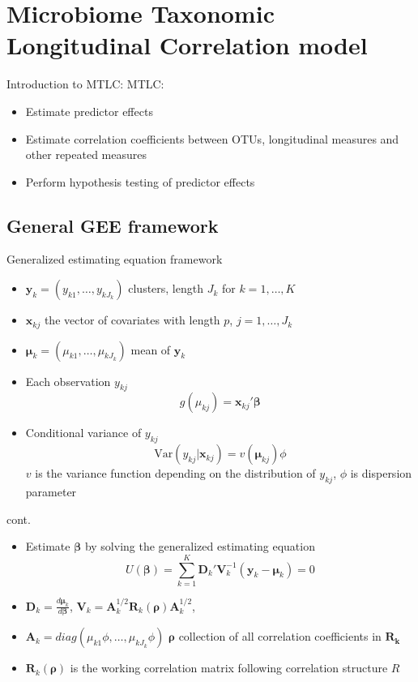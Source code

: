 \documentclass{beamer}
\begin{document}
\section{Microbiome Taxonomic Longitudinal Correlation model}


\begin{frame}[t]{Introduction to MTLC:}
  MTLC:
  \begin{itemize}
    \item Estimate predictor effects
    \item Estimate correlation coefficients between OTUs, longitudinal measures and other repeated measures
    \item Perform hypothesis testing of predictor effects
  \end{itemize}
\end{frame}

\subsection{General GEE framework}

\begin{frame}[t]{Generalized estimating equation framework}
  \begin{itemize}
    \item $\boldsymbol y_k = (y_{k1}, \ldots , y_{kJ_k})$ clusters, length $J_k$ for $k = 1, \ldots , K$
    \item $\mathbf{x}_{kj}$ the vector of covariates with length $p$, $j = 1, \ldots , J_k$
    \item $\boldsymbol\mu_k = (\mu_{k1}, \ldots , \mu_{kJ_k})$ mean of $\boldsymbol y_k$
    \item Each observation $y_{kj}$
    $$g(\mu_{kj}) = \mathbf{x}_{kj}'\boldsymbol\beta$$
    \item Conditional variance of $y_{kj}$
    $$\text{Var}(y_{kj}|\boldsymbol{x}_{kj}) = v(\boldsymbol \mu_{kj})\phi$$
    $v$ is the variance function depending on the distribution of $y_{kj}$, $\phi$ is dispersion parameter
  \end{itemize}
\end{frame}


\begin{frame}[t]{cont.}
  \begin{itemize}
    \item Estimate $\boldsymbol\beta$ by solving the generalized estimating equation
    $$U(\boldsymbol\beta) = \sum_{k = 1}^K \boldsymbol{D}_k'\boldsymbol{V}_{k}^{-1}(\boldsymbol{y}_k - \boldsymbol{\mu}_k) = 0$$
    \item $\boldsymbol{D}_k = \frac{d \boldsymbol\mu_k}{d \boldsymbol\beta}$, $\boldsymbol{V}_k = \boldsymbol{A}_k^{1/2}\boldsymbol{R}_k(\boldsymbol\rho)\boldsymbol{A}_k^{1/2}$,
    \item  $\boldsymbol{A}_k = diag(\mu_{k1}\phi, \ldots , \mu_{kJ_k}\phi)$ $\boldsymbol\rho$ collection of all correlation coefficients in $\boldsymbol{R_k}$
    \item $\boldsymbol R_k(\boldsymbol\rho)$ is the working correlation matrix following correlation structure $R$

  \end{itemize}
\end{frame}
\end{document}
